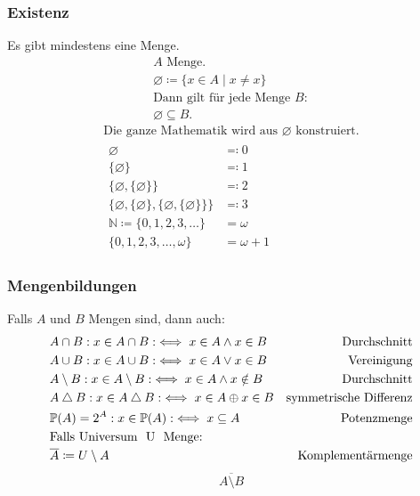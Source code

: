 \subsubsection{Existenz}
Es gibt mindestens eine Menge.
\begin{gather*}
	A \text{ Menge.} \\
	\varnothing \coloneqq \{ x \in A \mid x \neq x \} \\
	\text{Dann gilt für jede Menge } B: \\
	\varnothing \subseteq B .
\end{gather*}
\begin{gather*}
	\text{Die ganze Mathematik wird aus } \varnothing \text{ konstruiert.} \\
	\begin{aligned}
		\varnothing											& \eqqcolon 0	\\
		\{ \varnothing \}											& \eqqcolon 1	\\
		\{ \varnothing , \{ \varnothing \} \}							& \eqqcolon 2	\\
		\{ \varnothing , \{ \varnothing \} , \{ \varnothing , \{ \varnothing \} \} \}	& \eqqcolon 3	\\
		\mathbb{N} \coloneqq \{ 0 , 1 , 2 , 3 , \dotsc \}					& = \omega	\\
		\{ 0 , 1 , 2 , 3 , \dotsc , \omega \}								& = \omega + 1
	\end{aligned}
\end{gather*}

\subsubsection{Mengenbildungen}
Falls $A$ und $B$ Mengen sind, dann auch:
\begin{align*}
	& A \cap B : x \in A \cap B :\iff x \in A \wedge x\in B					& \text{Durchschnitt}			\\
	& A \cup B : x \in A \cup B :\iff x \in A \vee x\in B						& \text{Vereinigung}			\\
	& A \setminus B : x \in A \setminus B :\iff x \in A \wedge x\notin B			& \text{Durchschnitt}			\\
	& A \bigtriangleup B : x \in A \bigtriangleup B :\iff x \in A \oplus x\in B		& \text{symmetrische Differenz}	\\
	& \mathbb{P}( A ) = 2^A : x \in \mathbb{P}( A ) :\iff x \subseteq A			& \text{Potenzmenge}			\\
	\multicolumn{2}{l}{\text{Falls Universum } U \text{ Menge:}}										\\
	&\overline{A} \coloneqq U \setminus A								& \text{Komplementärmenge}	
\end{align*}
\[ \overline{A \setminus B} \]

